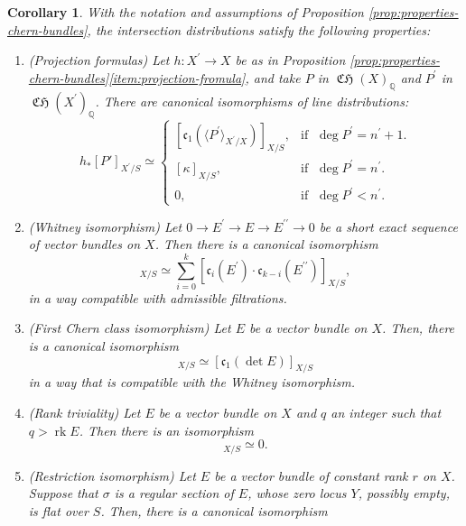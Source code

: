 \documentclass[11pt]{article}
\theoremstyle{plain}
\newtheorem{corollary}[theorem]{Corollary}
\theoremstyle{definition}
\newcommand{\QBbb}{\mathbb Q}
\newcommand{\cfrak}{\mathfrak c}
\newcommand{\bis}{\prime\prime}
\DeclareMathOperator{\CHfrak}{\mathfrak{CH}}
\DeclareMathOperator{\rk}{rk}
\begin{document}
\begin{corollary}\label{cor:properties-intersection-distribution}
With the notation and assumptions of Proposition \ref{prop:properties-chern-bundles}, the intersection distributions satisfy the following properties:
\begin{enumerate}
\item (Projection formulas) Let $h\colon X^{\prime}\to X$ be as in Proposition \ref{prop:properties-chern-bundles}\eqref{item:projection-fromula}, and take $P$ in $\CHfrak(X)_{\QBbb}$ and $P^{\prime}$ in $\CHfrak(X^{\prime})_{\QBbb}$. There are canonical isomorphisms of line distributions:
\begin{displaymath}
h_\ast [P']_{X^{\prime}/S} \simeq
\begin{cases}
\left[ \cfrak_1 (\langle P^{\prime} \rangle_{X^{\prime}/X})\right]_{X/S}, & \text{if }\; \deg P^{\prime}=n^{\prime}+1.\\
[ \kappa ]_{X/S}, & \text{if }\; \deg P^{\prime} = n^{\prime}. \\
0, & \text{if }\; \deg P^{\prime} < n^{\prime}.
\end{cases}
\end{displaymath}
\item\label{item:prop-int-dist-whitney} (Whitney isomorphism) Let $0 \to E^{\prime}\to E \to E^{\bis} \to 0$ be a short exact sequence of vector bundles on $X$. Then there is a canonical isomorphism
\begin{displaymath}
[\cfrak_{k}(E)]_{X/S}\simeq \sum_{i=0}^{k} [\cfrak_{i}(E^{\prime})\cdot\cfrak_{k-i}(E^{\bis})]_{X/S},
\end{displaymath}
in a way compatible with admissible filtrations.
\item\label{item:prop-int-dist-c1-det} (First Chern class isomorphism) Let $E$ be a vector bundle on $X$. Then, there is a canonical isomorphism
\begin{displaymath}
[\cfrak_1(E)]_{X/S} \simeq [\cfrak_1(\det E)]_{X/S}
\end{displaymath}
in a way that is compatible with the Whitney isomorphism.
\item\label{item:prop-int-dist-rank} (Rank triviality) Let $E$ be a vector bundle on $X$ and $q$ an integer such that $q > \rk E$. Then there is an isomorphism
\begin{displaymath}
[ \cfrak_q(E)]_{X/S} \simeq 0.
\end{displaymath}
\item\label{item:prop-int-dist-restriction} (Restriction isomorphism) Let $E$ be a vector bundle of constant rank $r$ on $X$. Suppose that $\sigma$ is a regular section of $E$, whose zero locus $Y$, possibly empty, is flat over $S$. Then, there is a canonical isomorphism

\end{enumerate}
\end{corollary}
\end{document}
